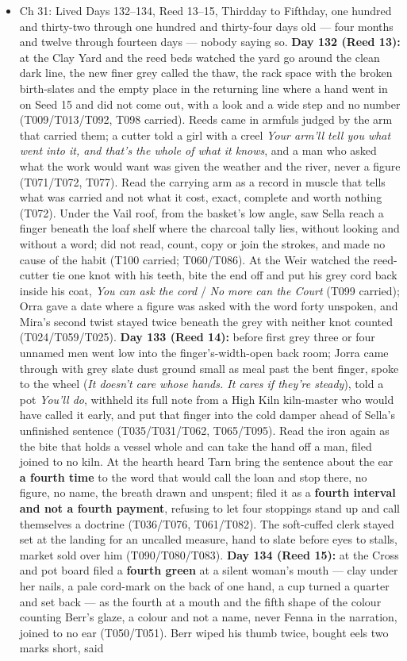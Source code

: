 \documentclass{design/chronicle}
\begin{document}
{\begin{itemize}[leftmargin=1.4em,itemsep=1pt,topsep=3pt,parsep=0pt]
\item Ch 31: Lived Days 132–134, Reed 13–15, Thirdday to Fifthday, one hundred and thirty-two through one hundred and thirty-four days old — four months and twelve through fourteen days — nobody saying so. \textbf{Day 132 (Reed 13):} at the Clay Yard and the reed beds watched the yard go around the clean dark line, the new finer grey called the thaw, the rack space with the broken birth-slates and the empty place in the returning line where a hand went in on Seed 15 and did not come out, with a look and a wide step and no number (T009/T013/T092, T098 carried). Reeds came in armfuls judged by the arm that carried them; a cutter told a girl with a creel \emph{Your arm’ll tell you what went into it, and that’s the whole of what it knows}, and a man who asked what the work would want was given the weather and the river, never a figure (T071/T072, T077). Read the carrying arm as a record in muscle that tells what was carried and not what it cost, exact, complete and worth nothing (T072). Under the Vail roof, from the basket’s low angle, saw Sella reach a finger beneath the loaf shelf where the charcoal tally lies, without looking and without a word; did not read, count, copy or join the strokes, and made no cause of the habit (T100 carried; T060/T086). At the Weir watched the reed-cutter tie one knot with his teeth, bite the end off and put his grey cord back inside his coat, \emph{You can ask the cord} / \emph{No more can the Court} (T099 carried); Orra gave a date where a figure was asked with the word forty unspoken, and Mira’s second twist stayed twice beneath the grey with neither knot counted (T024/T059/T025). \textbf{Day 133 (Reed 14):} before first grey three or four unnamed men went low into the finger’s-width-open back room; Jorra came through with grey slate dust ground small as meal past the bent finger, spoke to the wheel (\emph{It doesn’t care whose hands. It cares if they’re steady}), told a pot \emph{You’ll do}, withheld its full note from a High Kiln kiln-master who would have called it early, and put that finger into the cold damper ahead of Sella’s unfinished sentence (T035/T031/T062, T065/T095). Read the iron again as the bite that holds a vessel whole and can take the hand off a man, filed joined to no kiln. At the hearth heard Tarn bring the sentence about the ear \textbf{a fourth time} to the word that would call the loan and stop there, no figure, no name, the breath drawn and unspent; filed it as a \textbf{fourth interval and not a fourth payment}, refusing to let four stoppings stand up and call themselves a doctrine (T036/T076, T061/T082). The soft-cuffed clerk stayed set at the landing for an uncalled measure, hand to slate before eyes to stalls, market sold over him (T090/T080/T083). \textbf{Day 134 (Reed 15):} at the Cross and pot board filed a \textbf{fourth green} at a silent woman’s mouth — clay under her nails, a pale cord-mark on the back of one hand, a cup turned a quarter and set back — as the fourth at a mouth and the fifth shape of the colour counting Berr’s glaze, a colour and not a name, never Fenna in the narration, joined to no ear (T050/T051). Berr wiped his thumb twice, bought eels two marks short, said 
\end{itemize}}
\end{document}
